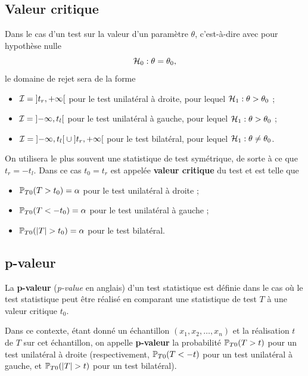 \subsection{Valeur critique}
Dans le cas d'un test sur la valeur d'un paramètre $\theta$, c'est-à-dire avec
pour hypothèse nulle 
\[
\mathcal{H}_0: \theta = \theta_0,
\]
le domaine de rejet sera de la forme
\begin{itemize}
	\item $\mathcal{I} = \mathopen]t_r, +\infty \mathclose[$ pour le test unilatéral à
	droite, pour lequel $\mathcal{H}_1 : \theta > \theta_0$ ;
	\item $\mathcal{I} = \mathopen]-\infty, t_l \mathclose[$ pour le test unilatéral à
	gauche, pour lequel $\mathcal{H}_1 : \theta > \theta_0$ ;
	\item
	$\mathcal{I} = \mathopen]-\infty, t_l \mathclose[ \cup \mathopen]t_r, +\infty
	\mathclose[$
	pour le test bilatéral, pour lequel $\mathcal{H}_1 : \theta \neq \theta_0$.
\end{itemize}

On utilisera le plus souvent une statistique de test symétrique, de sorte à
ce que $t_r = - t_l$.  Dans ce cas $t_0 = t_r$ est appelée
\textbf{valeur critique} du test et est telle que
\begin{itemize}
	\item $\mathbb{P}_{T0}(T > t_0) = \alpha$ pour le test unilatéral à droite ; 
	\item $\mathbb{P}_{T0}(T < - t_0) = \alpha$ pour le test unilatéral à gauche ; 
	\item $\mathbb{P}_{T0}(|T| > t_0) = \alpha$ pour le test bilatéral. 
\end{itemize}

\subsection{p-valeur}
La \textbf{p-valeur} (\textit{p-value} en anglais) d'un test statistique est
définie dans le cas où le test statistique peut être réalisé en comparant une
statistique de test $T$%
à
une valeur critique $t_0$.

Dans ce contexte, étant donné un échantillon $(x_1, x_2, \dots, x_n)$ et la
réalisation $t$ de $T$ sur cet échantillon, on appelle \textbf{p-valeur} la
probabilité $\mathbb{P}_{T0}(T > t)$ pour un test unilatéral à droite (respectivement,
$\mathbb{P}_{T0}(T < -t)$ pour un test unilatéral à gauche, et $\mathbb{P}_{T0}(\lvert T\rvert > t)$
pour un test bilatéral). 

